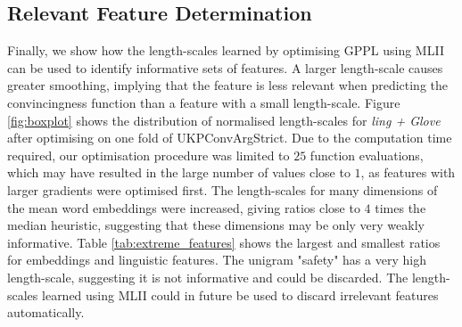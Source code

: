 
\subsection{Relevant Feature Determination}

Finally, we show how the length-scales learned by optimising GPPL using MLII can be used to identify
informative sets of features. 
A larger length-scale causes greater smoothing, 
implying that the feature is less relevant when predicting the convincingness function
than a feature with a small length-scale. 
Figure \ref{fig:boxplot} shows the distribution of normalised length-scales for \emph{ling + Glove}
after optimising on one fold of UKPConvArgStrict. 
Due to the computation time required, our optimisation procedure was limited to $25$ function evaluations,
which may have resulted in the large number of values close to $1$,
as features with larger gradients were optimised first.
The length-scales for many dimensions of the mean word embeddings were increased,
giving ratios close to $4$ times the median heuristic, suggesting that these dimensions may be
only very weakly informative. Table \ref{tab:extreme_features} shows the largest
and smallest ratios for embeddings and linguistic features. The unigram "safety" has
a very high length-scale, suggesting it is not informative and could be discarded. 
The length-scales learned using MLII could in future be used to discard irrelevant features
automatically. 

